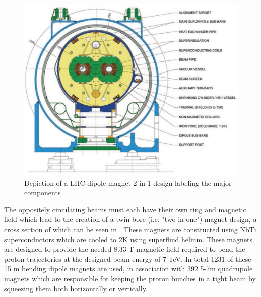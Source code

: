 \begin{figure}[!htbp] 
  \begin{center}
    \includegraphics[width=0.9\linewidth]{figures/lhc/dipole.jpg}
    \caption{ Depiction of a LHC dipole magnet 2-in-1 design labeling the major
components} 
    \label{fig:dipole} 
  \end{center} 
\end{figure}

The oppositely circulating beams must each  have their own ring and magnetic field
which lead to the creation of a twin-bore (i.e. "two-in-one") magnet design, a
cross section of which can be seen in . These magnets are constructed
using NbTi superconductors which are cooled to 2K using superfluid helium.
These magnets are designed to provide the needed 8.33 T magnetic field required
to bend the proton trajectories at the designed beam energy of 7 TeV.  In total 1231 of these 15
m bending dipole magnets are used, in association with 392 5-7m
quadrupole magnets which are responsible for keeping the proton bunches in a
tight beam by squeezing them both horizontally or vertically.
